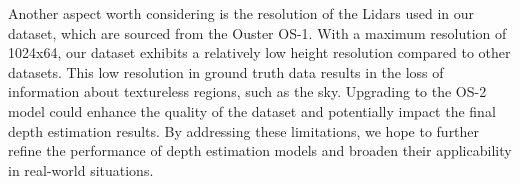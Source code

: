 \documentclass[english, LaM, oneside]{sapthesis}%
\begin{document}
Another aspect worth considering is the resolution of the Lidars used in our dataset, which are sourced from the Ouster OS-1. With a maximum resolution of 1024x64, our dataset exhibits a relatively low height resolution compared to other datasets. This low resolution in ground truth data results in the loss of information about textureless regions, such as the sky. Upgrading to the OS-2 model could enhance the quality of the dataset and potentially impact the final depth estimation results. By addressing these limitations, we hope to further refine the performance of depth estimation models and broaden their applicability in real-world situations.
\backmatter
{}

% 
\end{document}
